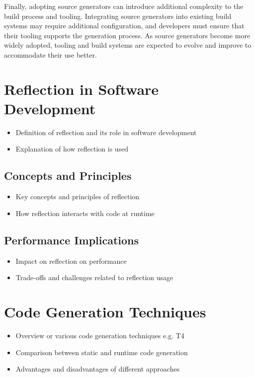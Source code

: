 Finally, adopting source generators can introduce additional complexity to the build process and tooling\cite{Microsoft2022SourceGenerators}. Integrating source generators into existing build systems may require additional configuration, and developers must ensure that their tooling supports the generation process. As source generators become more widely adopted, tooling and build systems are expected to evolve and improve to accommodate their use better.

\section{Reflection in Software Development}

\begin{itemize}
    \item Definition of reflection and its role in software development
    \item Explanation of how reflection is used
\end{itemize}

\subsection{Concepts and Principles}

\begin{itemize}
    \item Key concepts and principles of reflection
    \item How reflection interacts with code at runtime
\end{itemize}

\subsection{Performance Implications}

\begin{itemize}
    \item Impact on reflection on performance
    \item Trade-offs and challenges related to reflection usage
\end{itemize}

\section{Code Generation Techniques}

\begin{itemize}
    \item Overview or various code generation techniques e.g. T4
    \item Comparison between static and runtime code generation
    \item Advantages and disadvantages of different approaches
\end{itemize}

